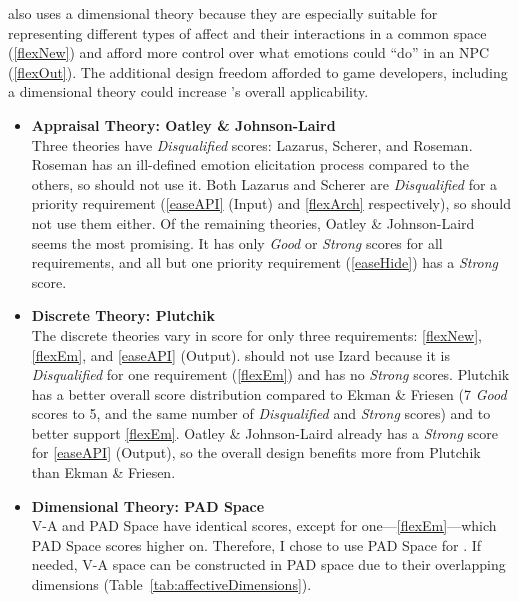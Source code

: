 \progname{} also uses a dimensional theory because they are especially suitable
for representing different types of affect and their interactions in a common
space (\ref{flexNew}) and afford more control over what emotions could ``do''
in an NPC (\ref{flexOut}). The additional design freedom afforded to game
developers, including a dimensional theory could increase \progname{}'s overall
applicability.
\begin{itemize}

    \item \textbf{Appraisal Theory: Oatley \& Johnson-Laird} \\
    Three theories have \textit{Disqualified} scores: Lazarus, Scherer, and
    Roseman. Roseman has an ill-defined emotion elicitation process compared to
    the others, so \progname{} should not use it. Both Lazarus and Scherer are
    \textit{Disqualified} for a priority requirement (\ref{easeAPI} (Input) and
    \ref{flexArch} respectively), so \progname{} should not use them either. Of
    the remaining theories, Oatley \& Johnson-Laird seems the most promising.
    It has only \textit{Good} or \textit{Strong} scores for all requirements,
    and all but one priority requirement (\ref{easeHide}) has a \textit{Strong}
    score.

    \item \textbf{Discrete Theory: Plutchik} \\
    The discrete theories vary in score for only three requirements:
    \ref{flexNew}, \ref{flexEm}, and \ref{easeAPI} (Output). \progname{} should
    not use Izard because it is \textit{Disqualified} for one requirement
    (\ref{flexEm}) and has no \textit{Strong} scores. Plutchik has a better
    overall score distribution compared to Ekman \& Friesen (7 \textit{Good}
    scores to 5, and the same number of \textit{Disqualified} and
    \textit{Strong} scores) and to better support \ref{flexEm}. Oatley \&
    Johnson-Laird already has a \textit{Strong} score for \ref{easeAPI}
    (Output), so the overall design benefits more from Plutchik than Ekman \&
    Friesen.

    \item \textbf{Dimensional Theory: PAD Space} \\
    V-A and PAD Space have identical scores, except for
    one---\ref{flexEm}---which PAD Space scores higher on. Therefore, I chose
    to use PAD Space for \progname{}. If needed, V-A space can be constructed
    in PAD space due to their overlapping dimensions
    (Table~\ref{tab:affectiveDimensions}).

\end{itemize}

